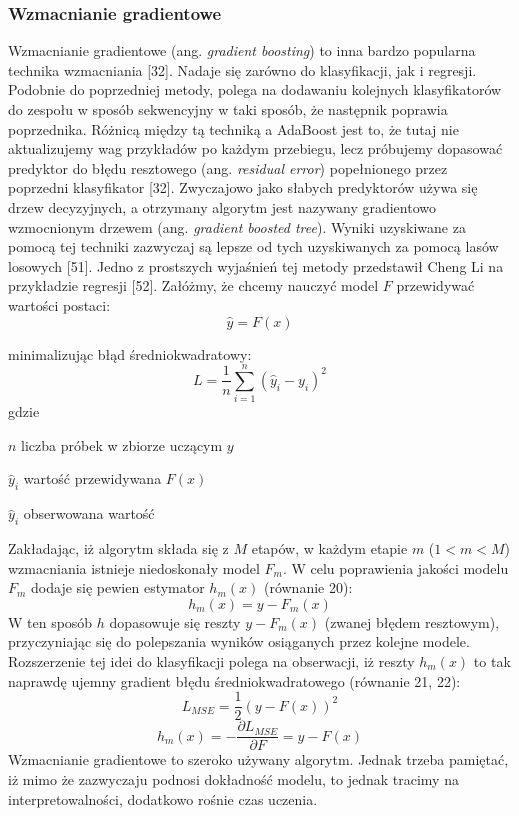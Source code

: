 
\subsubsection{Wzmacnianie gradientowe}
\label{cha:Wzmacnianie gradientowe}

Wzmacnianie gradientowe (ang. \textit{gradient boosting}) to inna bardzo popularna technika wzmacniania [32]. Nadaje się zarówno do klasyfikacji, jak i regresji. Podobnie do poprzedniej metody, polega na dodawaniu kolejnych klasyfikatorów do zespołu w sposób sekwencyjny w taki sposób, że następnik poprawia poprzednika. Różnicą między tą techniką a AdaBoost jest to, że tutaj nie aktualizujemy wag przykładów po każdym przebiegu, lecz próbujemy dopasować predyktor do błędu resztowego (ang. \textit{residual error}) popełnionego przez poprzedni klasyfikator [32]. Zwyczajowo jako słabych predyktorów używa się drzew decyzyjnych, a otrzymany algorytm jest nazywany gradientowo wzmocnionym drzewem (ang. \textit{gradient boosted tree}). Wyniki uzyskiwane za pomocą tej techniki zazwyczaj są lepsze od tych uzyskiwanych za pomocą lasów losowych [51]. Jedno z prostszych wyjaśnień tej metody przedstawił Cheng Li na przykładzie regresji [52]. Załóżmy, że chcemy nauczyć model $F$ przewidywać wartości postaci:
\begin{equation}
\hat y = F(x)
\end{equation}

\noindent minimalizując błąd średniokwadratowy:
\begin{equation}
L=\frac 1 n \sum_{i=1}^n(\hat y_i-y_i)^2
\end{equation}
gdzie
\begin{eqwhere}[2cm]
	\item $n$ liczba próbek w zbiorze uczącym $y$
	\item $\hat y_i$ wartość przewidywana $F(x)$
	\item $\hat y_i$ obserwowana wartość
\end{eqwhere}

\noindent Zakładając, iż algorytm składa się z $M$ etapów, w każdym etapie $m$ ($1<m<M$) wzmacniania istnieje niedoskonały model $F_m$. W celu poprawienia jakości modelu $ F_m$ dodaje się pewien estymator $h_m(x)$ (równanie 20):
\begin{equation}
	h_m(x)=y-F_m(x)
\end{equation}
W ten sposób $h$ dopasowuje się reszty $y-F_m(x)$ (zwanej błędem resztowym), przyczyniając się do polepszania wyników osiąganych przez kolejne modele. Rozszerzenie tej idei do klasyfikacji polega na obserwacji, iż reszty $h_m(x)$ to tak naprawdę ujemny gradient błędu średniokwadratowego (równanie 21, 22):
\begin{equation}
L_{MSE}=\frac 1 2(y-F(x))^2
\end{equation}
\begin{equation}
h_m(x)=-\frac {\partial L_{MSE}} {\partial F}=y-F(x)
\end{equation}
Wzmacnianie gradientowe to szeroko używany algorytm. Jednak trzeba pamiętać, iż mimo że zazwyczaju podnosi dokładność modelu, to jednak tracimy na interpretowalności, dodatkowo rośnie czas uczenia.

